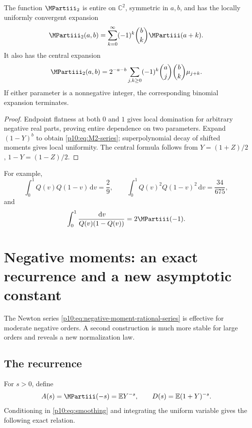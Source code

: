 \documentclass[11pt,oneside]{article}
\theoremstyle{definition}
\theoremstyle{remark}
\newcommand{\Q}{Q}
\newcommand{\E}{\mathbb E}
\newcommand{\C}{\mathbb C}
\newcommand{\dd}{\,\mathrm d}
\newcommand{\1}{\mathbf 1}
\begin{document}
\begin{proposition}\label{p10:prop:M2}
The function \(\MPartiii_2\) is entire on \(\C^2\), symmetric in \(a,b\), and has the
locally uniformly convergent expansion
\begin{equation}\label{p10:eq:M2-series}
 \MPartiii_2(a,b)=\sum_{k=0}^{\infty}(-1)^k\binom bk\MPartiii(a+k).
\end{equation}
It also has the central expansion
\begin{equation}\label{p10:eq:M2-central}
 \MPartiii_2(a,b)=2^{-a-b}
 \sum_{j,k\ge0}(-1)^k\binom aj\binom bk\mu_{j+k}.
\end{equation}
If either parameter is a nonnegative integer, the corresponding binomial expansion
terminates.
\end{proposition}

\begin{proof}
Endpoint flatness at both \(0\) and \(1\) gives local domination for arbitrary negative
real parts, proving entire dependence on two parameters.  Expand \((1-Y)^b\) to obtain
\cref{p10:eq:M2-series}; superpolynomial decay of shifted moments gives local uniformity.
The central formula follows from \(Y=(1+Z)/2\), \(1-Y=(1-Z)/2\).
\end{proof}

For example,
\begin{equation}\label{p10:eq:M2-examples}
 \int_0^1\Q(v)\Q(1-v)\dd v=\frac29,
 \qquad
 \int_0^1\Q(v)^2\Q(1-v)^2\dd v=\frac{34}{675},
\end{equation}
and
\begin{equation}\label{p10:eq:M2-negative-example}
 \int_0^1\frac{\dd v}{\Q(v)(1-\Q(v))}=2\MPartiii(-1).
\end{equation}

\section{Negative moments: an exact recurrence and a new asymptotic constant}

The Newton series \cref{p10:eq:negative-moment-rational-series} is effective for moderate
negative orders.  A second construction is much more stable for large orders and reveals
a new normalization law.

\subsection{The recurrence}

For \(s>0\), define
\begin{equation}\label{p10:eq:A-D-def}
 A(s)=\MPartiii(-s)=\E Y^{-s},
 \qquad
 D(s)=\E(1+Y)^{-s}.
\end{equation}
Conditioning in \cref{p10:eq:smoothing} and integrating the uniform variable gives the
following exact relation.
\end{document}
